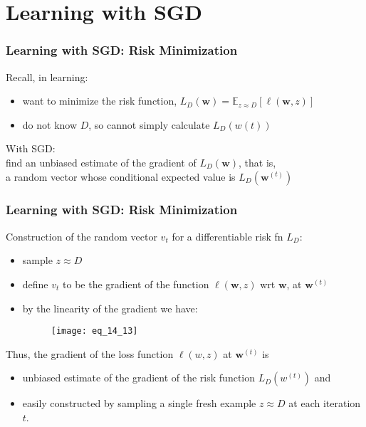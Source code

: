 \section{Learning with SGD}

\begin{frame}
\frametitle{Learning with SGD: Risk Minimization}

Recall, in learning:\\
\begin{itemize}
\item want to minimize the risk function, $L_D(\mathbf{w}) = \mathbb{E}_{z \approx D} [\ell(\mathbf{w}, z)]$
\item do not know $D$, so cannot simply calculate $L_D (w(t))$
\end{itemize}
\vspace{5mm}

With SGD:\\
find an unbiased estimate of the gradient of $L_D(\mathbf{w})$, that is,\\
a random vector whose conditional expected value is $L_D (\mathbf{w}^{(t)} )$

\end{frame}


\begin{frame}
\frametitle{Learning with SGD: Risk Minimization}

Construction of the random vector $v_t$ for  a differentiable risk fn $L_D$:
\begin{itemize}
\item sample $z \approx D$
\item define $v_t$ to be the gradient of the function $\ell(\mathbf{w}, z)$ wrt $\mathbf{w}$, at $\mathbf{w}^{(t)}$
\item by the linearity of the gradient we have:
    \begin{figure}
        \centering
        \texttt{[image: eq\_14\_13]}
    \end{figure}
\end{itemize}
\vspace{5mm}

Thus, the gradient of the loss function $\ell(w, z)$ at $\mathbf{w}^{(t)}$ is
\begin{itemize}
\item unbiased estimate of the gradient of the risk function $L_D( w^{(t)} )$ and
\item easily constructed by sampling a single fresh example $z \approx D$ at each iteration $t$.
\end{itemize}

\end{frame}


